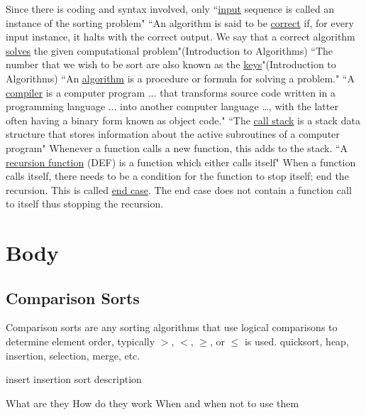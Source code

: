 \documentclass[12pt]{article}
\begin{document}
	Since there is coding and syntax involved, only 
	``\underline{input} sequence is called an instance of the sorting problem"\cite[p.~5]{intro}\newline
	``An algorithm is said to be \underline{correct} if, for every input instance, it halts with the correct output. We say that a correct algorithm \underline{solves} the given computational problem"(Introduction to Algorithms)\cite[p.~6]{intro}\newline
	``The number that we wish to be sort are also known as the \underline{keys}"(Introduction to Algorithms)\cite[p.~16]{intro}\newline
	``An \underline{algorithm} is a procedure or formula for solving a problem."\cite{wiki}\newline
	``A \underline{compiler} is a computer program ... that transforms source code written in a programming language ... into another computer language …, with the latter often having a binary form known as object code."\cite{wiki}\newline
	``The \underline{call stack} is a stack data structure that stores information about the active subroutines of a computer program"\cite{wiki} Whenever a function calls a new function, this adds to the stack.\newline
	``A \underline{recursion function} (DEF) is a function which either calls itself"\cite{wiki} When a function calls itself, there needs to be a condition for the function to stop itself; end the recursion. This is called \underline{end case}. The end case does not contain a function call to itself thus stopping the recursion.\newline
	
	\section{Body}
	
	\subsection{Comparison Sorts}
	Comparison sorts are any sorting algorithms that use logical comparisons to determine element order, typically $>$, $<$, $\ge$, or $\le$ is used.
	quicksort, heap, insertion, selection, merge, etc.
	
	insert insertion sort description
	
	What are they
	How do they work
	When and when not to use them
	
	
\end{document}
